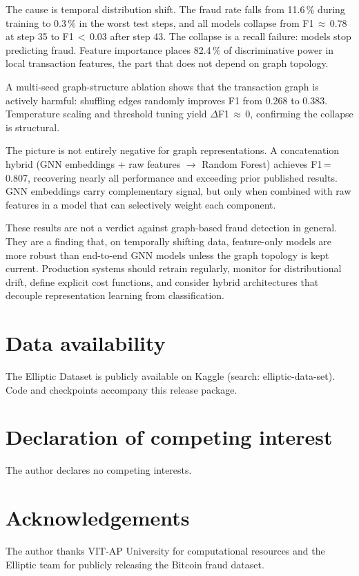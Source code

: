 The cause is temporal distribution shift.  The fraud rate falls from
11.6\,\% during training to 0.3\,\% in the worst test steps, and all
models collapse from F1\,$\approx$\,0.78 at step 35 to
F1\,$<$\,0.03 after step 43.  The collapse is a recall failure: models
stop predicting fraud.  Feature importance places 82.4\,\% of
discriminative power in local transaction features, the part that
does not depend on graph topology.

A multi-seed graph-structure ablation shows that the transaction graph
is actively harmful: shuffling edges randomly improves F1 from 0.268 to
0.383.  Temperature scaling and threshold tuning yield
$\Delta$F1\,$\approx$\,0, confirming the collapse is structural.

The picture is not entirely negative for graph representations.  A
concatenation hybrid (GNN embeddings + raw features $\to$ Random
Forest) achieves F1\,=\,0.807, recovering nearly all performance
and exceeding prior published results.  GNN embeddings carry
complementary signal, but only when combined with raw features in a
model that can selectively weight each component.

These results are not a verdict against graph-based fraud detection
in general.  They are a finding that, on temporally shifting data,
feature-only models are more robust than end-to-end GNN models unless
the graph topology is kept current.  Production systems should
retrain regularly, monitor for distributional drift, define explicit
cost functions, and consider hybrid architectures that decouple
representation learning from classification.

\section*{Data availability}
The Elliptic Dataset is publicly available on Kaggle
(search: elliptic-data-set).
Code and checkpoints accompany this release package.

\section*{Declaration of competing interest}
The author declares no competing interests.

\section*{Acknowledgements}
The author thanks VIT-AP University for computational resources and
the Elliptic team for publicly releasing the Bitcoin fraud dataset.
